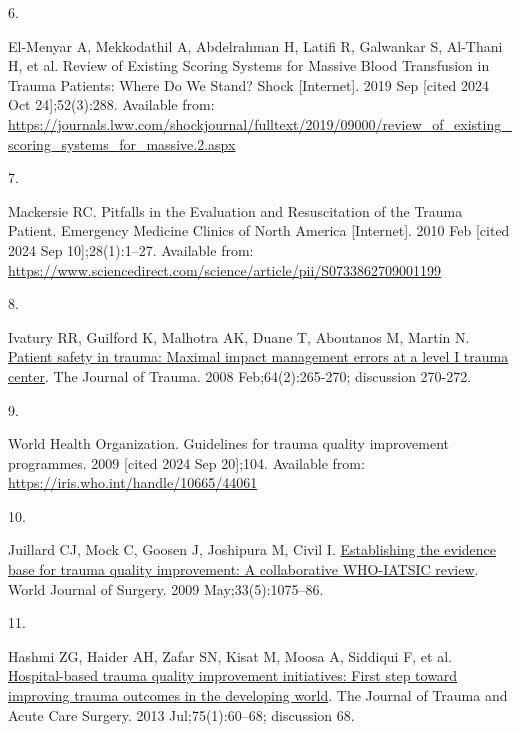 \documentclass[
]{article}
\newlength{\cslhangindent}
\newlength{\csllabelwidth}
\newlength{\cslentryspacingunit} %
\newenvironment{CSLReferences}[2] %
 {%
  \setlength{\parindent}{0pt}
  \ifodd #1
  \let\oldpar\par
  \def\par{\hangindent=\cslhangindent\oldpar}
  \fi
  \setlength{\parskip}{#2\cslentryspacingunit}
 }%
 {}
\newcommand{\CSLLeftMargin}[1]{\parbox[t]{\csllabelwidth}{#1}}
\newcommand{\CSLRightInline}[1]{\parbox[t]{\linewidth - \csllabelwidth}{#1}\break}
\begin{document}
\begin{CSLReferences}{0}{0}
\leavevmode{}%
\CSLLeftMargin{6. }%
\CSLRightInline{El-Menyar A, Mekkodathil A, Abdelrahman H, Latifi R,
Galwankar S, Al-Thani H, et al. Review of {Existing} {Scoring} {Systems}
for {Massive} {Blood} {Transfusion} in {Trauma} {Patients}: {Where} {Do}
{We} {Stand}? Shock {[}Internet{]}. 2019 Sep {[}cited 2024 Oct
24{]};52(3):288. Available from:
\url{https://journals.lww.com/shockjournal/fulltext/2019/09000/review_of_existing_scoring_systems_for_massive.2.aspx}}

\leavevmode{}%
\CSLLeftMargin{7. }%
\CSLRightInline{Mackersie RC. Pitfalls in the {Evaluation} and
{Resuscitation} of the {Trauma} {Patient}. Emergency Medicine Clinics of
North America {[}Internet{]}. 2010 Feb {[}cited 2024 Sep
10{]};28(1):1--27. Available from:
\url{https://www.sciencedirect.com/science/article/pii/S0733862709001199}}

\leavevmode{}%
\CSLLeftMargin{8. }%
\CSLRightInline{Ivatury RR, Guilford K, Malhotra AK, Duane T, Aboutanos
M, Martin N. \href{https://doi.org/10.1097/TA.0b013e318163359d}{Patient
safety in trauma: Maximal impact management errors at a level {I} trauma
center}. The Journal of Trauma. 2008 Feb;64(2):265-270; discussion
270-272. }

\leavevmode{}%
\CSLLeftMargin{9. }%
\CSLRightInline{World Health Organization. Guidelines for trauma quality
improvement programmes. 2009 {[}cited 2024 Sep 20{]};104. Available
from: \url{https://iris.who.int/handle/10665/44061}}

\leavevmode{}%
\CSLLeftMargin{10. }%
\CSLRightInline{Juillard CJ, Mock C, Goosen J, Joshipura M, Civil I.
\href{https://doi.org/10.1007/s00268-009-9959-8}{Establishing the
evidence base for trauma quality improvement: A collaborative
{WHO}-{IATSIC} review}. World Journal of Surgery. 2009
May;33(5):1075--86. }

\leavevmode{}%
\CSLLeftMargin{11. }%
\CSLRightInline{Hashmi ZG, Haider AH, Zafar SN, Kisat M, Moosa A,
Siddiqui F, et al.
\href{https://doi.org/10.1097/TA.0b013e31829880a0}{Hospital-based trauma
quality improvement initiatives: First step toward improving trauma
outcomes in the developing world}. The Journal of Trauma and Acute Care
Surgery. 2013 Jul;75(1):60--68; discussion 68. }


\end{CSLReferences}
\end{document}
